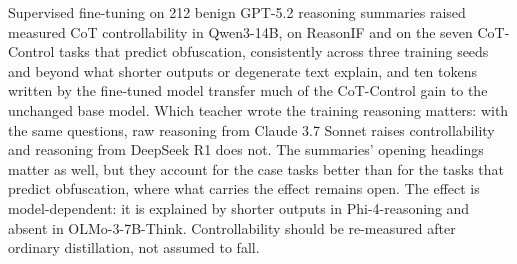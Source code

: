Supervised fine-tuning on 212 benign GPT-5.2 reasoning summaries raised measured CoT controllability in Qwen3-14B, on ReasonIF and on the seven CoT-Control tasks that predict obfuscation, consistently across three training seeds and beyond what shorter outputs or degenerate text explain, and ten tokens written by the fine-tuned model transfer much of the CoT-Control gain to the unchanged base model. Which teacher wrote the training reasoning matters: with the same questions, raw reasoning from Claude 3.7 Sonnet raises controllability and reasoning from DeepSeek R1 does not. The summaries' opening headings matter as well, but they account for the case tasks better than for the tasks that predict obfuscation, where what carries the effect remains open. The effect is model-dependent: it is explained by shorter outputs in Phi-4-reasoning and absent in OLMo-3-7B-Think. Controllability should be re-measured after ordinary distillation, not assumed to fall.
